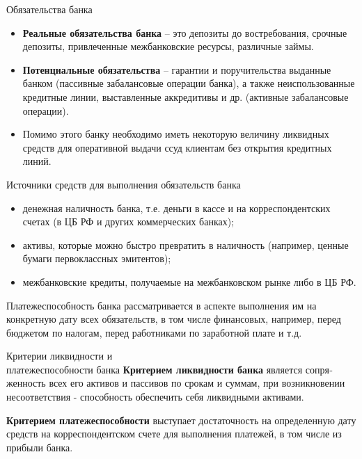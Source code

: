 \documentclass[_Banking_p2.tex]{subfiles}
\begin{document}
\begin{frame}[shrink=15]{Обязательства банка}
\begin{itemize}[<+->]
\item
\textbf{Реальные обязательства банка }– это депозиты до востребования, срочные депозиты, привлеченные межбанковские ре­сурсы, различные займы. 
\item
\textbf{Потенциальные обязательства }– гарантии и поручительства выданные банком (пассивные забалансовые операции банка), а также неиспользованные кредитные линии, выставленные аккредитивы и др. (актив­ные забалансовые операции). 
\item
Помимо этого банку необходимо иметь некоторую величину ликвидных средств для оперативной выдачи ссуд клиентам без открытия кредитных линий.
\end{itemize}
\end{frame}
\begin{frame}{Источники средств для выполнения обязательств банка}
\begin{itemize}[<+->]
\item
денежная наличность банка, т.е. деньги в кассе и на корреспондентских счетах (в ЦБ РФ и других коммерческих банках);
\item
активы, которые можно быстро превратить в наличность (например, ценные бумаги первоклассных эмитентов);
\item
межбанковские  кредиты, получаемые на межбанковском рынке либо в ЦБ РФ.
\end{itemize}
\end{frame}

\begin{frame}
\begin{block}{Платежеспособность банка}
\quad
рассматривается в аспекте выполнения им на конкретную дату всех обязательств, в том числе финансовых, например, перед бюджетом по налогам, перед работниками по заработной плате и т.д. 
\end{block}
\end{frame}
\begin{frame}{Критерии ликвидности и \\платежеспособности банка}
\textbf{Критерием ликвидности банка} является сопря­женность всех его активов и пассивов по срокам и суммам, при возникновении несоответствия - способность обеспечить себя ликвид­ными активами. 

\textbf{Критерием платежеспособности} выступает достаточ­ность на определенную дату средств на корреспондентском счете для выполнения платежей, в том числе из прибыли банка.
\end{frame}
\end{document}
